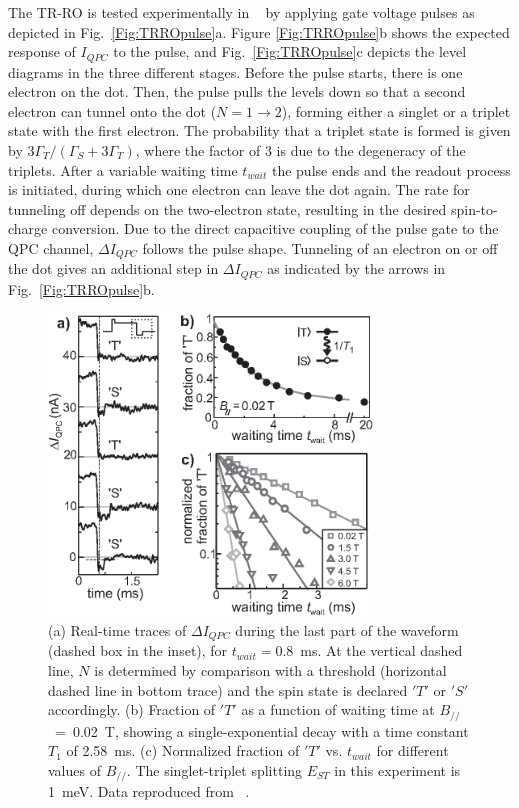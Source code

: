 \documentclass[rmp,twocolumn,aps]{revtex4}
\begin{document}
The TR-RO is tested experimentally in ~\textcite{HansonPRL2005} by applying gate voltage pulses as depicted in Fig.~\ref{Fig:TRROpulse}a. Figure \ref{Fig:TRROpulse}b shows the expected response of $I_{QPC}$ to the pulse, and Fig.~\ref{Fig:TRROpulse}c depicts the level diagrams in the three different stages. Before the pulse starts, there is one electron on the dot. Then, the pulse pulls the levels down so that a second electron can tunnel onto the dot ($N\!=\!1\!\rightarrow\!2$), forming either a singlet or a triplet state with the first electron.
The probability that a triplet state is formed is given by
$3\Gamma_T/(\Gamma_S + 3\Gamma_T)$, where the factor of 3 is due
to the degeneracy of the triplets. After a variable waiting time
$t_{wait}$ the pulse ends and the readout process is initiated,
during which one electron can leave the dot again. The rate for
tunneling off depends on the two-electron state, resulting in the
desired spin-to-charge conversion. Due to the direct capacitive
coupling of the pulse gate to the QPC channel, $\Delta I_{QPC}$
follows the pulse shape. Tunneling of an electron on or off the
dot gives an additional step in $\Delta I_{QPC}$ as indicated by
the arrows in Fig.~\ref{Fig:TRROpulse}b.

\begin{figure}[htb]
\includegraphics[width=3.4in, clip=true]{hanson_fig18.eps}
\caption{(a) Real-time traces of $\Delta I_{QPC}$ during the last
part of the waveform (dashed box in the inset), for
$t_{wait}\!=0.8$~ms. At the vertical dashed line, $N$ is
determined by comparison with a threshold (horizontal dashed line
in bottom trace) and the spin state is declared $'T'$ or $'S'$
accordingly. (b) Fraction of $'T'$ as a function of waiting time
at $B_{/\!/}\!$~=~0.02~T, showing a single-exponential decay with
a time constant $T_1$ of 2.58~ms. (c) Normalized fraction of $'T'$
vs. $t_{wait}$ for different values of $B_{/\!/}$. The
singlet-triplet splitting $E_{ST}$ in this experiment is 1~meV. Data reproduced from ~\textcite{HansonPRL2005}.}
\label{Fig:TRROresult}
\end{figure}
\end{document}
